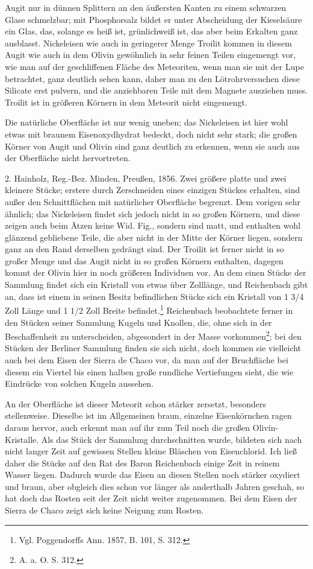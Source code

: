 \documentclass[a4paper, 11pt, oneside]{article}
\begin{document}
Augit nur in dünnen Splittern an den äußersten Kanten zu einem schwarzen Glase schmelzbar; mit Phosphorsalz bildet er unter Abscheidung der Kieselsäure ein Glas, das, solange es heiß ist, grünlichweiß ist, das aber beim Erkalten ganz ausblasst. Nickeleisen wie auch in geringerer Menge Troilit kommen in diesem Augit wie auch in dem Olivin gewöhnlich in sehr feinen Teilen eingemengt vor, wie man auf der geschliffenen Fläche des Meteoriten, wenn man sie mit der Lupe betrachtet, ganz deutlich sehen kann, daher man zu den Lötrohrversuchen diese Silicate erst pulvern, und die anziehbaren Teile mit dem Magnete ausziehen muss. Troilit ist in größeren Körnern in dem Meteorit nicht eingemengt.

Die natürliche Oberfläche ist nur wenig uneben; das Nickeleisen ist hier wohl etwas mit braunem Eisenoxydhydrat bedeckt, doch nicht sehr stark; die großen Körner von Augit und Olivin sind ganz deutlich zu erkennen, wenn sie auch aus der Oberfläche nicht hervortreten.

2. Hainholz, Reg.-Bez. Minden, Preußen, 1856. Zwei größere platte und zwei kleinere Stücke; erstere durch Zerschneiden eines einzigen Stückes erhalten, sind außer den Schnittflächen mit natürlicher Oberfläche begrenzt. Dem vorigen sehr ähnlich; das Nickeleisen findet sich jedoch nicht in so großen Körnern, und diese zeigen auch beim Ätzen keine Wid. Fig., sondern sind matt, und enthalten wohl glänzend gebliebene Teile, die aber nicht in der Mitte der Körner liegen, sondern ganz an den Rand derselben gedrängt sind. Der Troilit ist ferner nicht in so großer Menge und das Augit nicht in so großen Körnern enthalten, dagegen kommt der Olivin hier in noch größeren Individuen vor. An dem einen Stücke der Sammlung findet sich ein Kristall von etwas über Zolllänge, und Reichenbach gibt an, dass ist einem in seinen Besitz befindlichen Stücke sich ein Kristall von 1 3/4 Zoll Länge und 1 1/2 Zoll Breite befindet.\footnote{Vgl. Poggendorffs Ann. 1857, B. 101, S. 312.} Reichenbach beobachtete ferner in den Stücken seiner Sammlung Kugeln und Knollen, die, ohne sich in der Beschaffenheit zu unterscheiden, abgesondert in der Masse vorkommen\footnote{A. a. O. S. 312.}; bei den Stücken der Berliner Sammlung finden sie sich nicht, doch kommen sie vielleicht auch bei dem Eisen der Sierra de Chaco vor, da man auf der Bruchfläche bei diesem ein Viertel bis einen halben große rundliche Vertiefungen sieht, die wie Eindrücke von solchen Kugeln aussehen.

An der Oberfläche ist dieser Meteorit schon stärker zersetzt, besonders stellenweise. Dieselbe ist im Allgemeinen braun, einzelne Eisenkörnchen ragen daraus hervor, auch erkennt man auf ihr zum Teil noch die großen Olivin-Kristalle. Als das Stück der Sammlung durchschnitten wurde, bildeten sich nach nicht langer Zeit auf gewissen Stellen kleine Bläschen von Eisenchlorid. Ich ließ daher die Stücke auf den Rat des Baron Reichenbach einige Zeit in reinem Wasser liegen. Dadurch wurde das Eisen an diesen Stellen noch stärker oxydiert und braun, aber obgleich dies schon vor länger als anderthalb Jahren geschah, so hat doch das Rosten seit der Zeit nicht weiter zugenommen. Bei dem Eisen der Sierra de Chaco zeigt sich keine Neigung zum Rosten.
\clearpage
\end{document}
